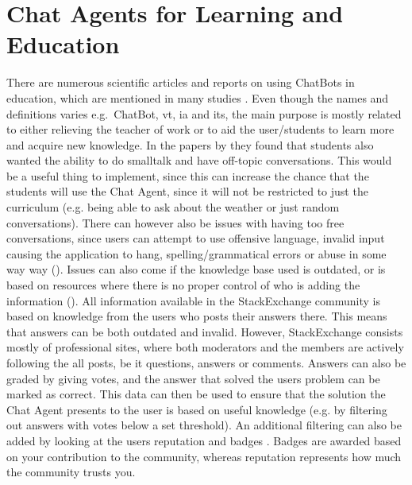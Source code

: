 \section{Chat Agents for Learning and Education}
\label{chapter3:learning_with_chatbots}
There are numerous scientific articles and reports on using ChatBots in education, which are mentioned in many studies 
 \cite{Crutzen2011,Kerly2008,Knill2004,Kowalski2013,Jia2009,Gulenko,Imran2014,Kerly2007,Reed2011,Rossi2011}. Even though the names and definitions varies e.g.~ChatBot, \gls{vt}, 
\gls{ia} and \gls{its}, the main purpose is mostly related to either relieving the teacher of work or to aid the user/students to learn more and acquire new knowledge. In the 
papers by \cite{Kerly2008,Knill2004,Kerly2007} they found that students also wanted the ability to do smalltalk and have off-topic conversations. This would be a useful thing 
to implement, since this can increase the chance that the students will use the Chat Agent, since it will not be restricted to just the curriculum (e.g. being able to ask about 
the weather or just random conversations). There can however also be issues with having too free conversations, since users can attempt to use offensive language, invalid input 
causing the application to hang, spelling/grammatical errors or abuse in some way way (\citet{Kerly2008}). Issues can also come if the knowledge base used is outdated, or is based 
on resources where there is no proper control of who is adding the information (\citet{Knill2004,Imran2014,Reed2011}).
\vspace{0.5em}\newline
All information available in the StackExchange community is based on knowledge from the users who posts their answers there. This means that answers can be both outdated and 
invalid. However, StackExchange consists mostly of professional sites, where both moderators and the members are actively following the all posts, be it questions, answers or 
comments. Answers can also be graded by giving votes, and the answer that solved the users problem can be marked as correct. This data can then be used to ensure that the 
solution the Chat Agent presents to the user is based on useful knowledge (e.g. by filtering out answers with votes below a set threshold). An additional filtering can also 
be added by looking at the users reputation and badges \cite{Stackoverflow.com2015d,Stackoverflow.com2015e,CommunityWiki2015a}. Badges are awarded based on your contribution 
to the community, whereas reputation represents how much the community trusts you.
